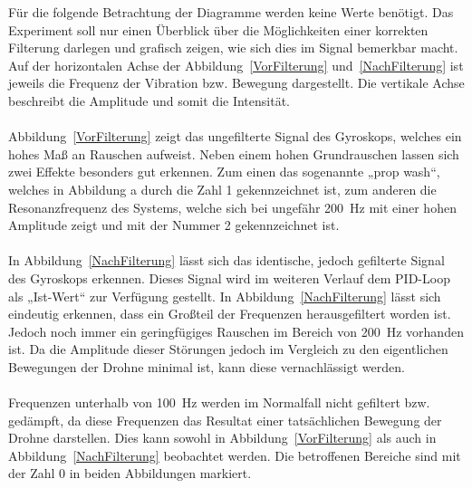        Für die folgende Betrachtung der Diagramme werden keine Werte benötigt. Das Experiment soll nur
       einen Überblick über die Möglichkeiten einer korrekten Filterung darlegen und grafisch zeigen,
       wie sich dies im Signal bemerkbar macht. Auf der horizontalen Achse der Abbildung~\ref*{VorFilterung}
       und~\ref*{NachFilterung} ist jeweils die Frequenz der Vibration bzw. Bewegung dargestellt.
       Die vertikale Achse beschreibt die Amplitude und somit die Intensität. \\
       \\
       Abbildung~\ref*{VorFilterung} zeigt das ungefilterte Signal des Gyroskops, welches ein hohes Maß an Rauschen aufweist.
       Neben einem hohen Grundrauschen lassen sich zwei Effekte besonders gut erkennen. Zum einen das
       sogenannte „prop wash“, welches in Abbildung a durch die Zahl 1 gekennzeichnet ist, zum anderen
       die Resonanzfrequenz des Systems, welche sich bei ungefähr \qty{200}{\Hz} mit einer hohen Amplitude zeigt
       und mit der Nummer 2 gekennzeichnet ist. \\
       \\
       In Abbildung~\ref*{NachFilterung} lässt sich das identische, jedoch gefilterte Signal des Gyroskops erkennen. Dieses
       Signal wird im weiteren Verlauf dem PID-Loop als „Ist-Wert“ zur Verfügung gestellt. In Abbildung~\ref*{NachFilterung} lässt
       sich eindeutig erkennen, dass ein Großteil der Frequenzen herausgefiltert worden ist. Jedoch noch
       immer ein geringfügiges Rauschen im Bereich von \qty{200}{\Hz} vorhanden ist. Da die Amplitude dieser Störungen
       jedoch im Vergleich zu den eigentlichen Bewegungen der Drohne minimal ist, kann diese vernachlässigt werden. \\
       \\
       Frequenzen unterhalb von \qty{100}{\Hz} werden im Normalfall nicht gefiltert bzw. gedämpft, da diese Frequenzen
       das Resultat einer tatsächlichen Bewegung der Drohne darstellen. Dies kann sowohl in Abbildung~\ref*{VorFilterung} als auch
       in Abbildung~\ref*{NachFilterung} beobachtet werden. Die betroffenen Bereiche sind mit der Zahl 0 in beiden Abbildungen markiert.
    \newpage 
